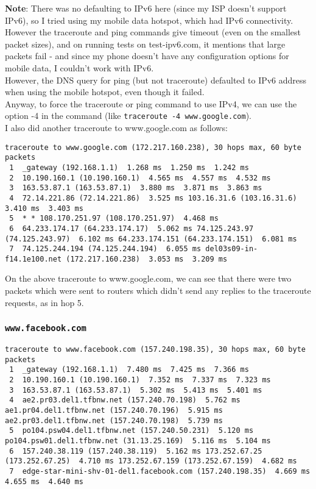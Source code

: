 \documentclass[a4paper]{article}
\newcommand{\nl}{\vspace{0.2cm}\\}
\begin{document}
\textbf{Note}: There was no defaulting to IPv6 here (since my ISP doesn't support IPv6), so I tried using my mobile data hotspot, which had IPv6 connectivity. However the traceroute and ping commands give timeout (even on the smallest packet sizes), and on running tests on test-ipv6.com, it mentions that large packets fail - and since my phone doesn't have any configuration options for mobile data, I couldn't work with IPv6.\nl
However, the DNS query for ping (but not traceroute) defaulted to IPv6 address when using the mobile hotspot, even though it failed.\nl
Anyway, to force the traceroute or ping command to use IPv4, we can use the option -4 in the command (like \texttt{traceroute -4 www.google.com}).\nl
I also did another traceroute to www.google.com as follows:

\begin{lstlisting}
traceroute to www.google.com (172.217.160.238), 30 hops max, 60 byte packets
 1  _gateway (192.168.1.1)  1.268 ms  1.250 ms  1.242 ms
 2  10.190.160.1 (10.190.160.1)  4.565 ms  4.557 ms  4.532 ms
 3  163.53.87.1 (163.53.87.1)  3.880 ms  3.871 ms  3.863 ms
 4  72.14.221.86 (72.14.221.86)  3.525 ms 103.16.31.6 (103.16.31.6)  3.410 ms  3.403 ms
 5  * * 108.170.251.97 (108.170.251.97)  4.468 ms
 6  64.233.174.17 (64.233.174.17)  5.062 ms 74.125.243.97 (74.125.243.97)  6.102 ms 64.233.174.151 (64.233.174.151)  6.081 ms
 7  74.125.244.194 (74.125.244.194)  6.055 ms del03s09-in-f14.1e100.net (172.217.160.238)  3.053 ms  3.209 ms
\end{lstlisting}

On the above traceroute to www.google.com, we can see that there were two packets which were sent to routers which didn't send any replies to the traceroute requests, as in hop 5.

\subsubsection{\texttt{www.facebook.com}}

\begin{lstlisting}
traceroute to www.facebook.com (157.240.198.35), 30 hops max, 60 byte packets
 1  _gateway (192.168.1.1)  7.480 ms  7.425 ms  7.366 ms
 2  10.190.160.1 (10.190.160.1)  7.352 ms  7.337 ms  7.323 ms
 3  163.53.87.1 (163.53.87.1)  5.302 ms  5.413 ms  5.401 ms
 4  ae2.pr03.del1.tfbnw.net (157.240.70.198)  5.762 ms ae1.pr04.del1.tfbnw.net (157.240.70.196)  5.915 ms ae2.pr03.del1.tfbnw.net (157.240.70.198)  5.739 ms
 5  po104.psw04.del1.tfbnw.net (157.240.50.231)  5.120 ms po104.psw01.del1.tfbnw.net (31.13.25.169)  5.116 ms  5.104 ms
 6  157.240.38.119 (157.240.38.119)  5.162 ms 173.252.67.25 (173.252.67.25)  4.710 ms 173.252.67.159 (173.252.67.159)  4.682 ms
 7  edge-star-mini-shv-01-del1.facebook.com (157.240.198.35)  4.669 ms  4.655 ms  4.640 ms
\end{lstlisting}
\end{document}
